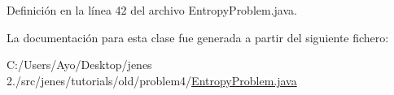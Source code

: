 Definición en la línea 42 del archivo Entropy\-Problem.\-java.



La documentación para esta clase fue generada a partir del siguiente fichero\-:\begin{DoxyCompactItemize}
\item 
C\-:/\-Users/\-Ayo/\-Desktop/jenes 2./src/jenes/tutorials/old/problem4/\hyperlink{old_2problem4_2_entropy_problem_8java}{Entropy\-Problem.\-java}\end{DoxyCompactItemize}
